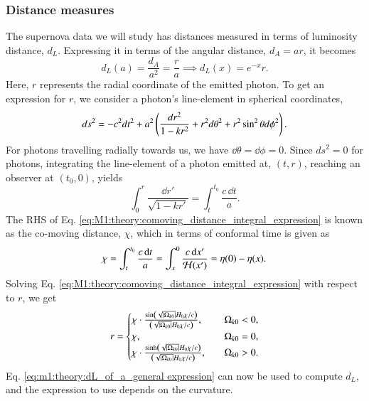 \subsubsection{Distance measures} 
The supernova data we will study has distances measured in terms of luminosity distance, $d_L$. Expressing it in terms of the angular distance, $d_A=ar$, it becomes 
\begin{equation}
    d_L(a) = \frac{d_A}{a^2} = \frac{r}{a} \implies d_L(x)=e^{-x}r. \label{eq:m1:theory:dL_of_a_general expression}
\end{equation} 
Here, $r$ represents the radial coordinate of the emitted photon. To get an expression for $r$, we consider a photon's line-element in spherical coordinates,
\begin{equation}
    ds^2 = -c^2 dt^2 + a^2 \left( \frac{dr^2}{1-kr^2} + r^2 d\theta^2 + r^2 \sin^2\theta d\phi^2 \right). \label{eq:M1:theory:FLRW_general_nonflat_spherical}
\end{equation} 
For photons travelling radially towards us, we have $\dd \theta=\dd\phi=0$. Since $ds^2=0$ for photons, integrating the line-element of a photon emitted at, $(t,r)$, reaching an observer at $(t_0, 0)$, yields 
\begin{equation}
    \int_0^r \frac{\dd r'}{\sqrt{1-k r'}} = \int_t^{t_0} \frac{c\,\dd t}{a}. \label{eq:M1:theory:comoving_distance_integral_expression}
\end{equation} 
%
The RHS of Eq. \eqref{eq:M1:theory:comoving_distance_integral_expression} is known as the co-moving distance, $\chi$, which in terms of conformal time is given as  
\begin{equation}
    \chi = \int_t^{t_0} \frac{c\,\dd t}{a} = \int_x^0 \frac{c\,\dd x'}{\mathcal{H}(x')} = \eta(0) - \eta(x). \label{eq:M1:theory:chi_eta0_minus_eta_of_x}
\end{equation}
%
Solving Eq. \eqref{eq:M1:theory:comoving_distance_integral_expression} with respect to $r$, we get
\begin{equation}
    r = \begin{cases}
        \chi\cdot \frac{\sin\left( \sqrt{\abs{\Omega_{k0}}} H_0 \chi / c \right)}{\left( \sqrt{\abs{\Omega_{k0}}} H_0 \chi / c \right)},\quad &\Omega_{k0} < 0, \\ 
        \chi,\quad &\Omega_{k0}=0, \\ 
        \chi\cdot \frac{\sinh\left( \sqrt{\abs{\Omega_{k0}}} H_0 \chi / c \right)}{\left( \sqrt{\abs{\Omega_{k0}}} H_0 \chi / c \right)},\quad &\Omega_{k0} > 0.
    \end{cases}
\end{equation} 
Eq. \eqref{eq:m1:theory:dL_of_a_general expression} can now be used to compute $d_L$, and the expression to use depends on the curvature.     


